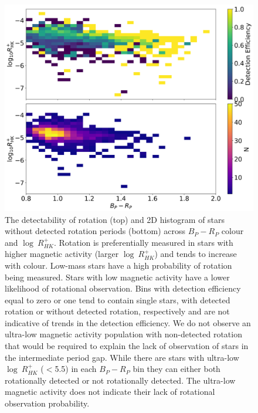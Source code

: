 \begin{figure}
\centering
  \includegraphics[width=\textwidth]{Figures/rot_gap_figures/detection_efficiency.png}
  \caption[The detectability of rotation (top) and 2D histogram of stars without detected rotation periods (bottom) across \gaia{} $B_P - R_P$ colour and $\log \ R^{+}_{HK}$.]{
  	The detectability of rotation (top) and 2D histogram of stars without detected rotation periods (bottom) across \gaia{} $B_P - R_P$ colour and $\log \ R^{+}_{HK}$. 
	Rotation is preferentially measured in stars with higher magnetic activity (larger $\log \ R^{+}_{HK}$) and tends to increase with colour. Low-mass stars have a high probability of rotation being measured. Stars with low magnetic activity have a lower likelihood of rotational observation. 
Bins with detection efficiency equal to zero or one tend to contain single stars, with detected rotation or without detected rotation, respectively and are not indicative of trends in the detection efficiency.
	We do not observe an ultra-low magnetic activity population with non-detected rotation that would be required to explain the lack of observation of stars in the intermediate period gap.
	While there are stars with ultra-low $\log \ R^{+}_{HK}$ ($<$5.5) in each $B_P-R_P$ bin they can either both rotationally detected or not rotationally detected. The ultra-low magnetic activity does not indicate their lack of rotational observation probability.
}
  \label{fig:detection_efficiency_rhk}
\end{figure}

